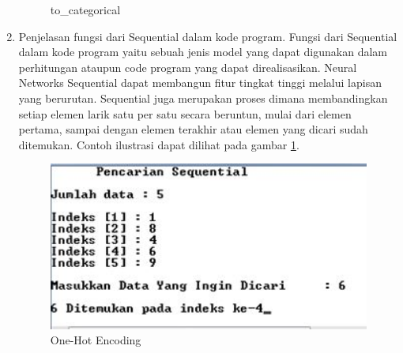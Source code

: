 \begin{enumerate}
\begin{figure}[!htbp]
\caption{to\_categorical}
\end{figure} 
\item Penjelasan fungsi dari Sequential dalam kode program.
\subitem Fungsi dari Sequential dalam kode program yaitu sebuah jenis model yang dapat digunakan dalam perhitungan ataupun code program yang dapat direalisasikan. Neural Networks Sequential dapat membangun fitur tingkat tinggi melalui lapisan yang berurutan. Sequential juga merupakan proses dimana membandingkan setiap elemen larik satu per satu secara beruntun, mulai dari elemen pertama, sampai dengan elemen terakhir atau elemen yang dicari sudah ditemukan.  Contoh ilustrasi dapat dilihat pada gambar \ref{c6t_8}.
\begin{figure}[!htbp]
\centerline{\includegraphics[width=1\textwidth]{figures/c6t/8.JPG}}
\caption{One-Hot Encoding}
\label{c6t_8}
\end{figure} 
\end{enumerate}


